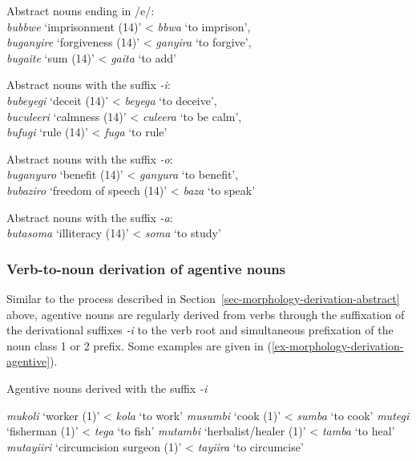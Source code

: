 \ea \label{ex-verb-to-noun-derivation}
\begin{xlist}
\ex Abstract nouns ending in /e/:\\
\textit{bubbwe} ‘imprisonment (14)’	 < \textit{bbwa} ‘to imprison’,\\
\textit{buganyire}  ‘forgiveness  (14)’	< \textit{ganyira}  ‘to forgive’,\\
\textit{bugaite} ‘sum  (14)’		< \textit{gaita}       ‘to add’

\ex Abstract nouns with the suffix \textit{-i}:\\
\textit{bubeyegi}  `deceit  (14)’ < \textit{beyega} ‘to deceive’,\\
\textit{buculeeri} ‘calmness  (14)’  < \textit{culeera}	 ‘to be calm’,\\
\textit{bufugi}     ‘rule  (14)’	< \textit{fuga} ‘to rule’

\ex  \label{ex-verb-to-noun-derivation-baziro}
Abstract nouns with the suffix \textit{-o}:\\
\textit{buganyuro} `benefit  (14)’ <  \textit{ganyura} ‘to benefit’,\\
\textit{bubaziro} `freedom of speech  (14)’ <  \textit{baza} ‘to speak’

\ex  \label{ex-verb-to-noun-derivation-butasoma}
Abstract nouns with the suffix \textit{-a}:\\
\textit{butasoma} `illiteracy  (14)’ < \textit{soma} ‘to study’
\end{xlist}
\z

\subsubsection{Verb-to-noun derivation of agentive nouns}\label{sec-morphology-derivation-agentive}

Similar to the process described in  Section~\ref{sec-morphology-derivation-abstract} above, 
agentive nouns are regularly derived from verbs through the suffixation of the derivational suffixes \textit{-i} 
to the verb root and simultaneous prefixation of the noun class 1 or 2 prefix. Some examples are given in (\ref{ex-morphology-derivation-agentive}).

\newpage
\ea  Agentive nouns derived with the suffix \textit{-i} \label{ex-morphology-derivation-agentive}
\begin{xlist}
\ex  \textit{mukoli} ‘worker (1)’ <  \textit{kola} ‘to work’ 
\ex  \textit{musumbi} ‘cook (1)’ <  \textit{sumba} ‘to cook’ 
\ex  \textit{mutegi} ‘fisherman (1)’ <  \textit{tega} ‘to fish’
\ex  \textit{mutambi} ‘herbalist/healer (1)’ <  \textit{tamba} ‘to heal’
\ex  \textit{mutayiiri} ‘circumcision surgeon (1)’ <  \textit{tayiira} ‘to circumcise’ 
\end{xlist}
\z


